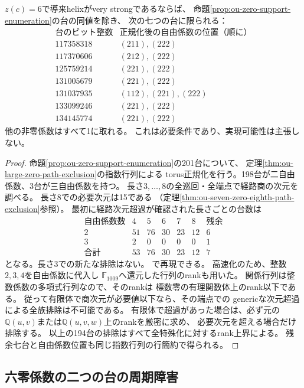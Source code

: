 \begin{theorem}[六零係数の七つの必要条件台]
\label{thm:ou-six-zero-path-exclusion}
$z(c)=6$で導来helixがvery strongであるならば、
命題\ref{prop:ou-zero-support-enumeration}の台の同値を除き、
次の七つの台に限られる：
\[
\begin{array}{r|l}
\text{台のビット整数}&\text{正規化後の自由係数の位置（順に）}\\ \hline
117358318&(211),(222)\\
117370606&(212),(222)\\
125759214&(221),(222)\\
131005679&(221),(222)\\
131037935&(112),(221),(222)\\
133099246&(221),(222)\\
134145774&(221),(222)
\end{array}
\]
他の非零係数はすべて1に取れる。
これは必要条件であり、実現可能性は主張しない。
\end{theorem}
\begin{proof}
命題\ref{prop:ou-zero-support-enumeration}の201台について、
定理\ref{thm:ou-large-zero-path-exclusion}の指数行列による
torus正規化を行う。198台が二自由係数、3台が三自由係数を持つ。
長さ$3,\ldots,8$の全巡回・全端点で経路商の次元を調べる。
長さ8での必要次元は15である
（定理\ref{thm:ou-seven-zero-eighth-path-exclusion}参照）。
最初に経路次元超過が確認された長さごとの台数は
\[
\begin{array}{r|rrrrr|r}
\text{自由係数数}&4&5&6&7&8&\text{残余}\\ \hline
2&51&76&30&23&12&6\\
3&2&0&0&0&0&1\\ \hline
\text{合計}&53&76&30&23&12&7
\end{array}
\]
となる。長さ3での新たな排除はない。
で再現できる。
高速化のため、整数$2,3,4$を自由係数に代入し
$\mathbb F_{1009}$へ還元した行列のrankも用いた。
関係行列は整数係数の多項式行列なので、そのrankは
標数零の有理関数体上のrank以下である。
従って有限体で商次元が必要値以下なら、その端点での
genericな次元超過による全族排除は不可能である。
有限体で超過があった場合は、必ず元の
$\mathbb Q(u,v)$または$\mathbb Q(u,v,w)$上のrankを厳密に求め、
必要次元を超える場合だけ排除する。
以上の194台の排除はすべて全特殊化に対するrank上界による。
残余七台と自由係数位置も同じ指数行列の行簡約で得られる。
\end{proof}

\subsection{六零係数の二つの台の周期障害}
\label{subsec:ou-six-zero-periodic}

